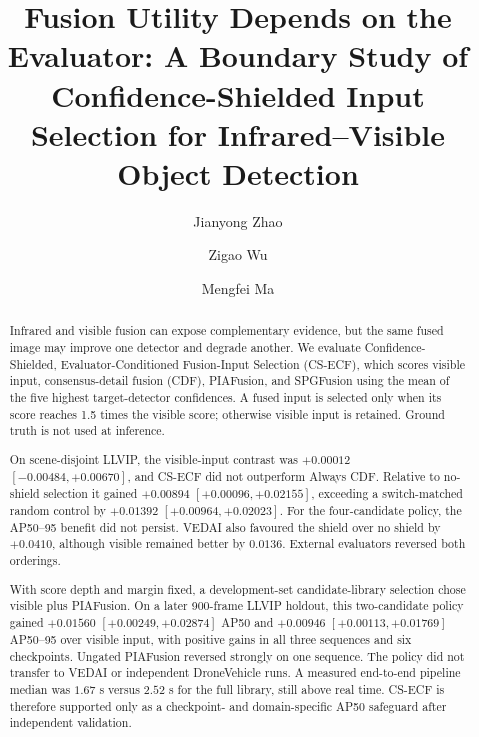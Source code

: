 \documentclass[preprint,11pt]{elsarticle}
\begin{document}
\sloppy

\begin{frontmatter}

\title{Fusion Utility Depends on the Evaluator: A Boundary Study of Confidence-Shielded Input Selection for Infrared--Visible Object Detection}

\author[AUTHOR]{Jianyong Zhao}

\author[AUTHOR]{Zigao Wu}

\author[AUTHOR]{Mengfei Ma}


\begin{abstract}
Infrared and visible fusion can expose complementary evidence, but the same
fused image may improve one detector and degrade another. We evaluate
Confidence-Shielded, Evaluator-Conditioned Fusion-Input Selection (CS-ECF),
which scores visible input, consensus-detail fusion (CDF), PIAFusion, and
SPGFusion using the mean of the five highest target-detector confidences. A
fused input is selected only when its score reaches 1.5 times the visible
score; otherwise visible input is retained. Ground truth is not used at
inference.

On scene-disjoint LLVIP, the visible-input contrast was \(+0.00012\)
\([-0.00484,+0.00670]\), and CS-ECF did not outperform Always CDF. Relative to
no-shield selection it gained \(+0.00894\) \([+0.00096,+0.02155]\), exceeding
a switch-matched random control by \(+0.01392\)
\([+0.00964,+0.02023]\). For the four-candidate policy, the AP50--95 benefit
did not persist. VEDAI also favoured the shield over no shield by \(+0.0410\),
although visible remained better by \(0.0136\). External evaluators reversed
both orderings.

With score depth and margin fixed, a development-set candidate-library
selection chose visible plus PIAFusion. On a later 900-frame LLVIP holdout, this
two-candidate policy gained \(+0.01560\) \([+0.00249,+0.02874]\) AP50 and
\(+0.00946\) \([+0.00113,+0.01769]\) AP50--95 over visible input, with positive
gains in all three sequences and six checkpoints. Ungated PIAFusion reversed
strongly on one sequence. The policy did not transfer to VEDAI or independent
DroneVehicle runs. A measured end-to-end pipeline median was \(1.67\) s versus
\(2.52\) s for the full library, still above real time. CS-ECF is therefore
supported only as a checkpoint- and domain-specific AP50 safeguard after
independent validation.
\end{abstract}


\end{frontmatter}
\end{document}
